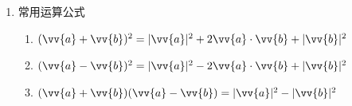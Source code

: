 \begin{enumerate}
\begin{enumerate}
            两个向量的夹角余弦等于其数量积与两向量模长乘积的比值：$cos<\vv{a}, \vv{b}> = \dfrac{\vv{a} \cdot \vv{b}}{|\vv{a}||\vv{b}|}$。\\
            特别地，\textbf{两个非零向量相互垂直的充要条件是其数量积为0}。
        \end{enumerate}
    \item 常用运算公式
        \begin{enumerate}
            \item $(\vv{a} + \vv{b})^2 = |\vv{a}|^2 + 2\vv{a} \cdot \vv{b} + |\vv{b}|^2$
            \item $(\vv{a} - \vv{b})^2 = |\vv{a}|^2 - 2\vv{a} \cdot \vv{b} + |\vv{b}|^2$
            \item $(\vv{a} + \vv{b})(\vv{a} - \vv{b}) = |\vv{a}|^2 - |\vv{b}|^2$
        \end{enumerate}
\end{enumerate}

